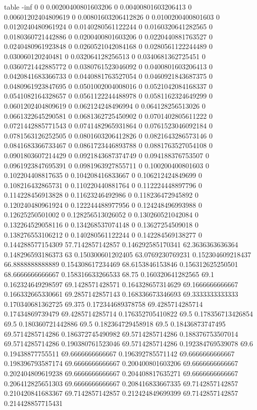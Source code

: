 table {%
-inf 0
0 0.00200400801603206
0 0.00400801603206413
0 0.00601202404809619
0 0.00801603206412826
0 0.0100200400801603
0 0.0120240480961924
0 0.0140280561122244
0 0.0160320641282565
0 0.0180360721442886
0 0.0200400801603206
0 0.0220440881763527
0 0.0240480961923848
0 0.0260521042084168
0 0.0280561122244489
0 0.030060120240481
0 0.032064128256513
0 0.0340681362725451
0 0.0360721442885772
0 0.0380761523046092
0 0.0400801603206413
0 0.0420841683366733
0 0.0440881763527054
0 0.0460921843687375
0 0.0480961923847695
0 0.0501002004008016
0 0.0521042084168337
0 0.0541082164328657
0 0.0561122244488978
0 0.0581162324649299
0 0.0601202404809619
0 0.062124248496994
0 0.064128256513026
0 0.0661322645290581
0 0.0681362725450902
0 0.0701402805611222
0 0.0721442885771543
0 0.0741482965931864
0 0.0761523046092184
0 0.0781563126252505
0 0.0801603206412826
0 0.0821643286573146
0 0.0841683366733467
0 0.0861723446893788
0 0.0881763527054108
0 0.0901803607214429
0 0.0921843687374749
0 0.094188376753507
0 0.0961923847695391
0 0.0981963927855711
0 0.100200400801603
0 0.102204408817635
0 0.104208416833667
0 0.106212424849699
0 0.108216432865731
0 0.110220440881764
0 0.112224448897796
0 0.114228456913828
0 0.11623246492986
0 0.118236472945892
0 0.120240480961924
0 0.122244488977956
0 0.124248496993988
0 0.12625250501002
0 0.128256513026052
0 0.130260521042084
0 0.132264529058116
0 0.134268537074148
0 0.13627254509018
0 0.138276553106212
0 0.140280561122244
0 0.142284569138277
0 0.144288577154309
57.7142857142857 0.146292585170341
62.3636363636364 0.148296593186373
63 0.150300601202405
63.0769230769231 0.152304609218437
66.8888888888889 0.154308617234469
68.6153846153846 0.156312625250501
68.6666666666667 0.158316633266533
68.75 0.160320641282565
69.1 0.162324649298597
69.1428571428571 0.164328657314629
69.1666666666667 0.166332665330661
69.2857142857143 0.168336673346693
69.3333333333333 0.170340681362725
69.375 0.172344689378758
69.4285714285714 0.17434869739479
69.4285714285714 0.176352705410822
69.5 0.178356713426854
69.5 0.180360721442886
69.5 0.182364729458918
69.5 0.18436873747495
69.5714285714286 0.186372745490982
69.5714285714286 0.188376753507014
69.5714285714286 0.190380761523046
69.5714285714286 0.192384769539078
69.6 0.19438877755511
69.6666666666667 0.196392785571142
69.6666666666667 0.198396793587174
69.6666666666667 0.200400801603206
69.6666666666667 0.202404809619238
69.6666666666667 0.204408817635271
69.6666666666667 0.206412825651303
69.6666666666667 0.208416833667335
69.7142857142857 0.210420841683367
69.7142857142857 0.212424849699399
69.7142857142857 0.214428857715431
}

